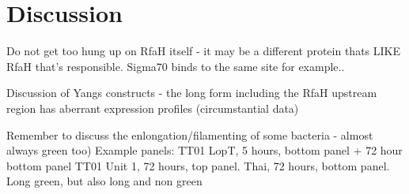 \section{Discussion}

Do not get too hung up on RfaH itself - it may be a different protein thats LIKE RfaH that's responsible. Sigma70 binds to the same site for example..\citep{Sevostyanova2008}




Discussion of Yangs constructs - the long form including the RfaH upstream region has aberrant expression profiles (circumstantial data)

Remember to discuss the enlongation/filamenting of some bacteria - almost always green too)
Example panels:
TT01 LopT, 5 hours, bottom panel + 72 hour bottom panel
TT01 Unit 1, 72 hours, top panel.
Thai, 72 hours, bottom panel. Long green, but also long and non green
